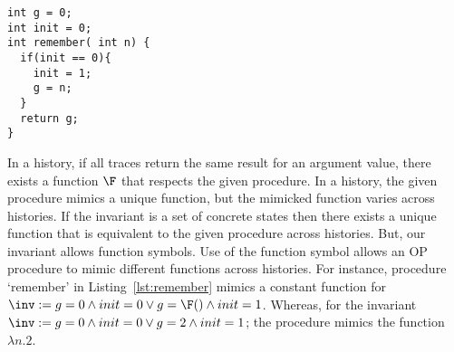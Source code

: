 \begin{lstlisting}[caption={Procedure `remember' : always returns the
      argument from its first call}, label=lst:remember]
int g = 0;
int init = 0;
int remember( int n) {
  if(init == 0){
    init = 1;
    g = n;
  }
  return g;
}
\end{lstlisting}

In a history, if all traces return the same result for an argument
value, there exists a function $\F$ that respects the given
procedure. In a history, the given procedure mimics a unique function,
but the mimicked function varies across histories. If the invariant is
a set of concrete states then there exists a unique function that is
equivalent to the given procedure across histories. But, our invariant
allows function symbols. Use of the function symbol allows an OP
procedure to mimic different functions across histories. For instance,
procedure `remember' in Listing~\ref{lst:remember} mimics a constant
function for $\inv := g=0 \wedge init=0 \vee g= \F() \wedge
init=1$. Whereas, for the invariant $\inv := g=0 \wedge init=0 \vee
g=2 \wedge init=1$; the procedure mimics the function $\lambda n.2$.
